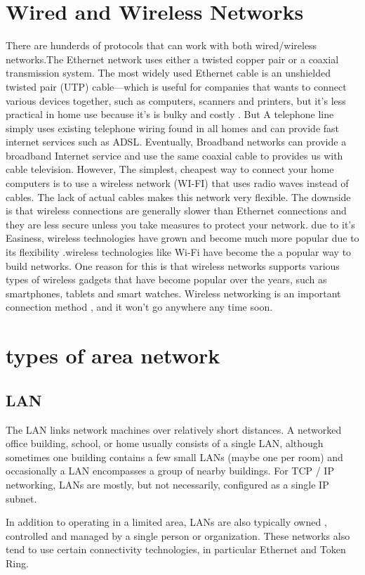 \documentclass[12pt]{article}
\begin{document}
\section{Wired and Wireless Networks}

There are hunderds of protocols that can work with both wired/wireless networks.The Ethernet network uses either a twisted copper pair or a coaxial transmission system. The most widely used Ethernet cable is an unshielded twisted pair (UTP) cable—which is useful for companies that wants to connect various devices together, such as computers, scanners and printers, but it's less practical in home use because it's is bulky and costly . But A telephone line simply uses existing telephone wiring found in all homes and can provide fast  internet services such as ADSL. Eventually, Broadband networks can provide a broadband Internet service and use the same coaxial cable to provides us with cable television. However, The simplest, cheapest way to connect your home computers is to use a wireless network (WI-FI) that uses radio waves instead of cables. The lack of actual cables makes this network very flexible. The downside is that wireless connections are generally slower than Ethernet connections and they are less secure unless you take measures to protect your network. due to it's Easiness, wireless technologies have grown and become much more popular due to its flexibility .wireless technologies like Wi-Fi have become the a popular way to build networks. One reason for this is that wireless networks supports various types of wireless gadgets that have become popular over the years, such as smartphones, tablets and smart watches. Wireless networking is an important connection method , and it won't go anywhere any time soon. \cite{11}
\section{types of area network}
\subsection{LAN}
The LAN links network machines over relatively short distances. A networked office building, school, or home usually consists of a single LAN, although sometimes one building contains a few small LANs (maybe one per room) and occasionally a LAN encompasses a group of nearby buildings. For TCP / IP networking, LANs are mostly, but not necessarily, configured as a single IP subnet. 

In addition to operating in a limited area, LANs are also typically owned , controlled and managed by a single person or organization. These networks also tend to use certain connectivity technologies, in particular Ethernet and Token Ring.
\end{document}
